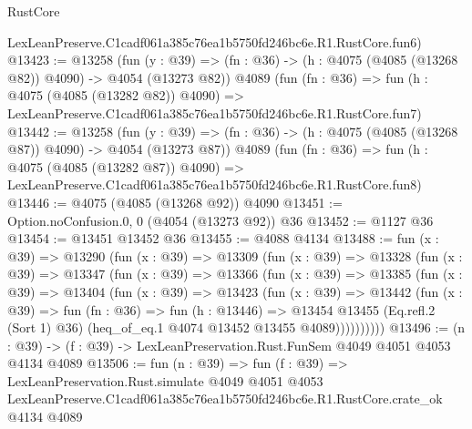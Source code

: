\begin{lexlean}{RustCore}
\begin{coremodule}
    LexLeanPreserve.C1cadf061a385c76ea1b5750fd246bc6e.R1.RustCore.fun6)
@13423 := @13258
    (fun (y : @39) => (fn : @36) -> (h : @4075 (@4085 (@13268 @82)) @4090) -> @4054 (@13273 @82))
    @4089
    (fun (fn : @36) =>
    fun (h : @4075 (@4085 (@13282 @82)) @4090) =>
    LexLeanPreserve.C1cadf061a385c76ea1b5750fd246bc6e.R1.RustCore.fun7)
@13442 := @13258
    (fun (y : @39) => (fn : @36) -> (h : @4075 (@4085 (@13268 @87)) @4090) -> @4054 (@13273 @87))
    @4089
    (fun (fn : @36) =>
    fun (h : @4075 (@4085 (@13282 @87)) @4090) =>
    LexLeanPreserve.C1cadf061a385c76ea1b5750fd246bc6e.R1.RustCore.fun8)
@13446 := @4075 (@4085 (@13268 @92)) @4090
@13451 := Option.noConfusion.{0, 0} (@4054 (@13273 @92)) @36
@13452 := @1127 @36
@13454 := @13451 @13452 @36
@13455 := @4088 @4134
@13488 := fun (x : @39) =>
  @13290
    (fun (x : @39) =>
    @13309
      (fun (x : @39) =>
      @13328
        (fun (x : @39) =>
        @13347
          (fun (x : @39) =>
          @13366
            (fun (x : @39) =>
            @13385
              (fun (x : @39) =>
              @13404
                (fun (x : @39) =>
                @13423
                  (fun (x : @39) =>
                  @13442
                    (fun (x : @39) =>
                    fun (fn : @36) =>
                    fun (h : @13446) =>
                    @13454
                      @13455
                      (Eq.refl.{2} (Sort 1) @36)
                      (heq_of_eq.{1} @4074 @13452 @13455 @4089))))))))))
@13496 := (n : @39) -> (f : @39) -> LexLeanPreservation.Rust.FunSem @4049 @4051 @4053 @4134 @4089
@13506 := fun (n : @39) =>
  fun (f : @39) =>
  LexLeanPreservation.Rust.simulate
    @4049
    @4051
    @4053
    LexLeanPreserve.C1cadf061a385c76ea1b5750fd246bc6e.R1.RustCore.crate_ok
    @4134
    @4089
\end{coremodule}
\end{lexlean}
